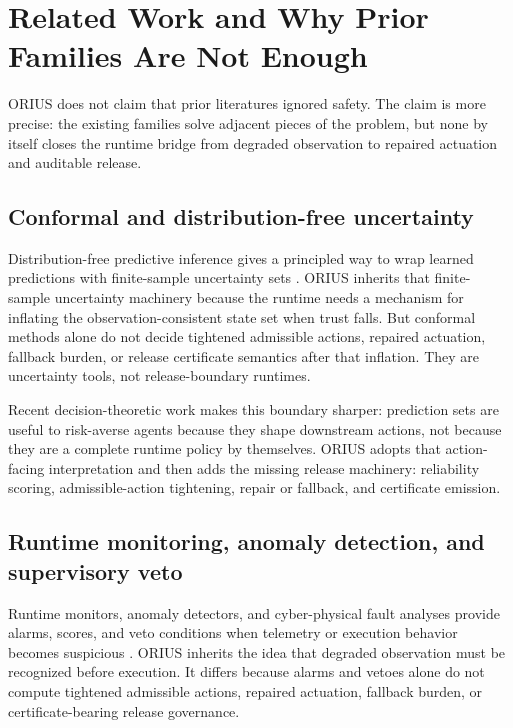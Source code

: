 \section{Related Work and Why Prior Families Are Not Enough}
\label{sec:ieee-related-work}

ORIUS does not claim that prior literatures ignored safety. The claim is more precise:
the existing families solve adjacent pieces of the problem, but none by itself closes
the runtime bridge from degraded observation to repaired actuation and auditable
release.

\subsection{Conformal and distribution-free uncertainty}
Distribution-free predictive inference gives a principled way to wrap learned
predictions with finite-sample uncertainty sets
\cite{vovk2005algorithmic,lei2018distribution,romano2019conformalized,gibbs2021adaptive,angelopoulos2023gentle,barber2023beyond,zaffran2022adaptive,kiyani2025decision}.
ORIUS inherits that finite-sample uncertainty machinery because the runtime needs a
mechanism for inflating the observation-consistent state set when trust falls. But
conformal methods alone do not decide tightened admissible actions, repaired actuation,
fallback burden, or release certificate semantics after that inflation. They are
uncertainty tools, not release-boundary runtimes.

Recent decision-theoretic work makes this boundary sharper: prediction sets are useful
to risk-averse agents because they shape downstream actions, not because they are a
complete runtime policy by themselves. ORIUS adopts that action-facing interpretation
and then adds the missing release machinery: reliability scoring, admissible-action
tightening, repair or fallback, and certificate emission.

\subsection{Runtime monitoring, anomaly detection, and supervisory veto}
Runtime monitors, anomaly detectors, and cyber-physical fault analyses provide alarms,
scores, and veto conditions when telemetry or execution behavior becomes suspicious
\cite{havelund2004runtime,bartocci2018introduction,basseville1993detection,page1954continuous,page1955test,hinkley1971inference,rajkumar2010cps,pasqualetti2013attack,teixeira2015secure,liu2008isolation,breunig2000lof}.
ORIUS inherits the idea that degraded observation must be recognized before execution.
It differs because alarms and vetoes alone do not compute tightened admissible actions,
repaired actuation, fallback burden, or certificate-bearing release governance.

